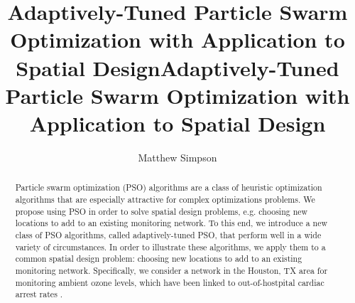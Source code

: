 \documentclass[cmbright]{staauth}
\begin{document}
\blind
{
  \title{Adaptively-Tuned Particle Swarm Optimization with Application to Spatial Design}
  \author{Matthew Simpson\corrauth}
  \address{Department of Statistics, University of Missouri,\\
    146 Middlebush Hall, Columbia, MO 65211-6100}
}\fi

\blind
{
  \title{Adaptively-Tuned Particle Swarm Optimization with Application to Spatial Design}
  \author{}
  \address{}
  \corremail{}
  \received{}
  \accepted{}
}\fi
\begin{abstract}
Particle swarm optimization (PSO) algorithms are a class of heuristic optimization algorithms that are especially attractive for complex optimizations problems. We propose using PSO in order to solve spatial design problems, e.g. choosing new locations to add to an existing monitoring network. To this end, we introduce a new class of PSO algorithms, called adaptively-tuned PSO, that perform well in a wide variety of circumstances. In order to illustrate these algorithms, we apply them to a common spatial design problem: choosing new locations to add to an existing monitoring network. Specifically, we consider a network in the Houston, TX area for monitoring ambient ozone levels, which have been linked to out-of-hostpital cardiac arrest rates \citep{ensor2013case}.
\end{abstract}
\maketitle
\end{document}
